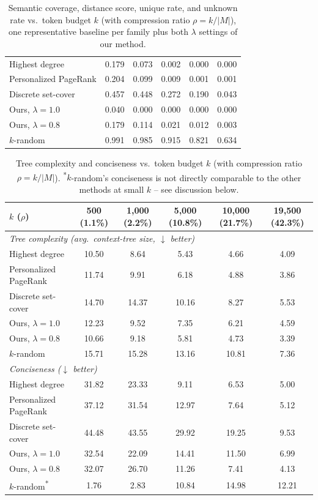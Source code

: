 \begin{table}[h]
\begin{tabular}{lccccc}
Highest degree            & 0.179 & 0.073 & 0.002 & 0.000 & 0.000 \\
Personalized PageRank     & 0.204 & 0.099 & 0.009 & 0.001 & 0.001 \\
Discrete set-cover        & 0.457 & 0.448 & 0.272 & 0.190 & 0.043 \\
Ours, $\lambda=1.0$       & 0.040 & 0.000 & 0.000 & 0.000 & 0.000 \\
Ours, $\lambda=0.8$       & 0.179 & 0.114 & 0.021 & 0.012 & 0.003 \\
$k$-random                & 0.991 & 0.985 & 0.915 & 0.821 & 0.634 \\
\bottomrule
\end{tabular}
\caption{Semantic coverage, distance score, unique rate, and unknown
rate vs.\ token budget $k$ (with compression ratio $\rho=k/|M|$), one
representative baseline per family plus both $\lambda$ settings of our
method.}
\label{tab:precision-trend}
\end{table}

\begin{table}[h]
\centering
\small
\begin{tabular}{lccccc}
\toprule
$k$ ($\rho$) & 500 (1.1\%) & 1{,}000 (2.2\%) & 5{,}000 (10.8\%) & 10{,}000 (21.7\%) & 19{,}500 (42.3\%) \\
\midrule
\multicolumn{6}{l}{\textit{Tree complexity (avg.\ context-tree size, $\downarrow$ better)}} \\
Highest degree            & 10.50 & 8.64  & 5.43  & 4.66  & 4.09 \\
Personalized PageRank     & 11.74 & 9.91  & 6.18  & 4.88  & 3.86 \\
Discrete set-cover        & 14.70 & 14.37 & 10.16 & 8.27  & 5.53 \\
Ours, $\lambda=1.0$       & 12.23 & 9.52  & 7.35  & 6.21  & 4.59 \\
Ours, $\lambda=0.8$       & 10.66 & 9.18  & 5.81  & 4.73  & 3.39 \\
$k$-random                & 15.71 & 15.28 & 13.16 & 10.81 & 7.36 \\
\midrule
\multicolumn{6}{l}{\textit{Conciseness ($\downarrow$ better)}} \\
Highest degree            & 31.82 & 23.33 & 9.11  & 6.53  & 5.00 \\
Personalized PageRank     & 37.12 & 31.54 & 12.97 & 7.64  & 5.12 \\
Discrete set-cover        & 44.48 & 43.55 & 29.92 & 19.25 & 9.53 \\
Ours, $\lambda=1.0$       & 32.54 & 22.09 & 14.41 & 11.50 & 6.99 \\
Ours, $\lambda=0.8$       & 32.07 & 26.70 & 11.26 & 7.41  & 4.13 \\
$k$-random\textsuperscript{*} & 1.76 & 2.83 & 10.84 & 14.98 & 12.21 \\
\bottomrule
\end{tabular}
\caption{Tree complexity and conciseness vs.\ token budget $k$ (with
compression ratio $\rho=k/|M|$). \textsuperscript{*}$k$-random's
conciseness is not directly comparable to the other methods at small
$k$ -- see discussion below.}
\label{tab:efficiency-trend}
\end{table}

